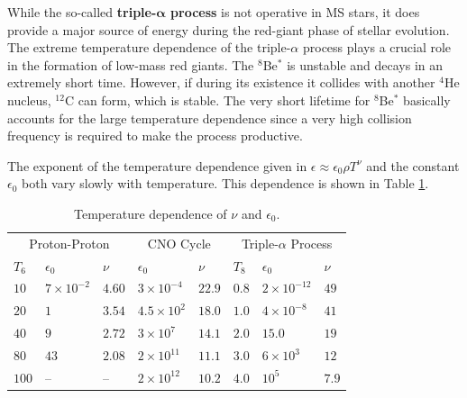 \documentclass[a4paper,10pt]{article}
\begin{document}
{\noindent}While the so-called \textbf{triple-$\mathbf{\alpha}$ process} is not operative in MS stars, it does provide a major source of energy during the red-giant phase of stellar evolution. The extreme temperature dependence of the triple-$\alpha$ process plays a crucial role in the formation of low-mass red giants. The $^8$Be$^*$ is unstable and decays in an extremely short time. However, if during its existence it collides with another $^4$He nucleus, $^{12}$C can form, which is stable. The very short lifetime for $^8$Be$^*$ basically accounts for the large temperature dependence since a very high collision frequency is required to make the process productive.

{\noindent}The exponent of the temperature dependence given in $\epsilon\approx\epsilon_0\rho T^\nu$ and the constant $\epsilon_0$ both vary slowly with temperature. This dependence is shown in Table \ref{table:tempdepen}.

\begin{table}[]
\begin{tabular}{llllllll}
\hline
\multicolumn{3}{c}{Proton-Proton} & \multicolumn{2}{c}{CNO Cycle} & \multicolumn{3}{c}{Triple-$\alpha$ Process} \\
\cmidrule(l){1-3} \cmidrule(l){4-5} \cmidrule(l){6-8}
$T_6$ & $\epsilon_0$ & $\nu$ & $\epsilon_0$ & $\nu$ & $T_8$ & $\epsilon_0$ & $\nu$ \\
\hline
$10$  & $7\times10^{-2}$ & $4.60$ & $3\times10^{-4}$ & $22.9$ & $0.8$ & $2\times10^{-12}$ & $49$ \\
$20$  & $1$              & $3.54$ & $4.5\times10^2$  & $18.0$ & $1.0$ & $4\times10^{-8}$ & $41$ \\
$40$  & $9$              & $2.72$ & $3\times10^7$    & $14.1$ & $2.0$ & $15.0$ & $19$ \\
$80$  & $43$             & $2.08$ & $2\times10^{11}$ & $11.1$ & $3.0$ & $6\times10^3$ & $12$ \\
$100$ & --               & --     & $2\times10^{12}$ & $10.2$ & $4.0$ & $10^5$ & $7.9$ \\
\hline
\end{tabular}
\caption{Temperature dependence of $\nu$ and $\epsilon_0$.}
\label{table:tempdepen}
\end{table}
\end{document}

